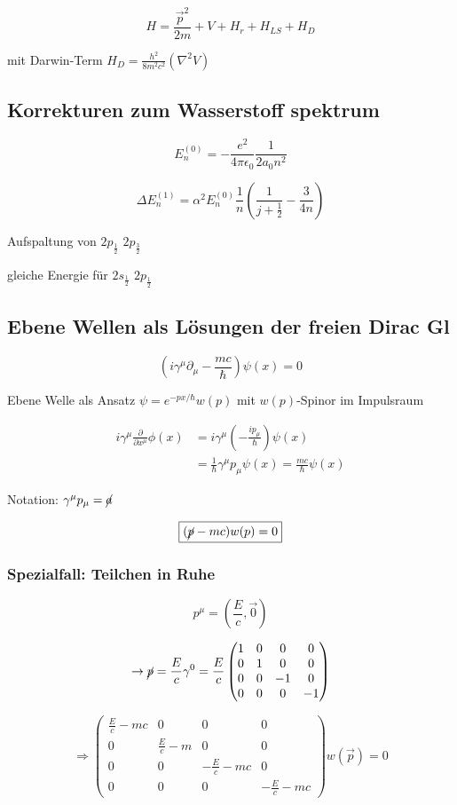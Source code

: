 \[H= \frac{\vec p^2}{2m}+V+H_r+H_{LS}+H_D\]

mit Darwin-Term \(H_D=\frac{h^2}{8m^2c^2}(\nabla^2 V)\)


\subsection{Korrekturen zum Wasserstoff spektrum}

\[E^{(0)}_n = -\frac{e^2}{4\pi\epsilon_0}\frac{1}{2a_0n^2}\]

\[\Delta E^{(1)}_n = \alpha^2 E^{(0)}_n \frac{1}{n}(\frac{1}{j+\frac{1}{2}}-\frac{3}{4n}) \]

Aufspaltung von \(2p_{\frac{1}{2}}\)  \(2p_{\frac{3}{2}}\)

gleiche Energie für \(2s_{\frac{1}{2}}\)  \(2p_{\frac{1}{2}}\)


\subsection{Ebene Wellen als Lösungen der freien Dirac Gl}

\[\left(i\gamma^\mu\partial_\mu-\frac{mc}{\hbar}\right)\psi(x) = 0\]

Ebene Welle als Ansatz \(\psi = e^{-px/\hbar}w(p)\) mit \(w(p)\)-Spinor im Impulsraum

\begin{align}
i\gamma^\mu\frac{\partial}{\partial x^\mu}\phi(x) &= i\gamma^\mu(-\frac{ip_\mu}{\hbar})\psi(x)\\
&=\frac{1}{\hbar}\gamma^\mu p_\mu \psi(x) = \frac{mc}{\hbar}\psi(x)
\end{align}

Notation: \(\gamma^\mu p_\mu = \cancel a\)

\[\boxed{(\cancel p - mc)w(p) = 0}\]

\subsubsection{Spezialfall: Teilchen in Ruhe}

\[p^\mu = (\frac{E}{c},\vec 0)\]


\[\rightarrow \cancel p = \frac{E}{c}\gamma^0 = \frac{E}{c} \begin{pmatrix}1&0&0&0\\ 0&1&0&0\\0&0&-1&0\\0&0&0&-1\end{pmatrix} \]

\[\Rightarrow \begin{pmatrix}\frac{E}{c}-mc&0&0&0\\ 0&\frac{E}{c}-m &0&0\\0&0&-\frac{E}{c}-mc&0\\0&0&0&-\frac{E}{c}-mc\end{pmatrix} w(\vec p) = 0\]

